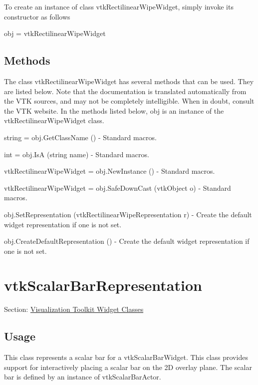 To create an instance of class vtk\-Rectilinear\-Wipe\-Widget, simply invoke its constructor as follows \begin{DoxyVerb}  obj = vtkRectilinearWipeWidget
\end{DoxyVerb}
 \hypertarget{vtkwidgets_vtkxyplotwidget_Methods}{}\subsection{Methods}\label{vtkwidgets_vtkxyplotwidget_Methods}
The class vtk\-Rectilinear\-Wipe\-Widget has several methods that can be used. They are listed below. Note that the documentation is translated automatically from the V\-T\-K sources, and may not be completely intelligible. When in doubt, consult the V\-T\-K website. In the methods listed below, {\ttfamily obj} is an instance of the vtk\-Rectilinear\-Wipe\-Widget class. 
\begin{DoxyItemize}
\item {\ttfamily string = obj.\-Get\-Class\-Name ()} -\/ Standard macros.  
\item {\ttfamily int = obj.\-Is\-A (string name)} -\/ Standard macros.  
\item {\ttfamily vtk\-Rectilinear\-Wipe\-Widget = obj.\-New\-Instance ()} -\/ Standard macros.  
\item {\ttfamily vtk\-Rectilinear\-Wipe\-Widget = obj.\-Safe\-Down\-Cast (vtk\-Object o)} -\/ Standard macros.  
\item {\ttfamily obj.\-Set\-Representation (vtk\-Rectilinear\-Wipe\-Representation r)} -\/ Create the default widget representation if one is not set.  
\item {\ttfamily obj.\-Create\-Default\-Representation ()} -\/ Create the default widget representation if one is not set.  
\end{DoxyItemize}\hypertarget{vtkwidgets_vtkscalarbarrepresentation}{}\section{vtk\-Scalar\-Bar\-Representation}\label{vtkwidgets_vtkscalarbarrepresentation}
Section\-: \hyperlink{sec_vtkwidgets}{Visualization Toolkit Widget Classes} \hypertarget{vtkwidgets_vtkxyplotwidget_Usage}{}\subsection{Usage}\label{vtkwidgets_vtkxyplotwidget_Usage}
This class represents a scalar bar for a vtk\-Scalar\-Bar\-Widget. This class provides support for interactively placing a scalar bar on the 2\-D overlay plane. The scalar bar is defined by an instance of vtk\-Scalar\-Bar\-Actor.


